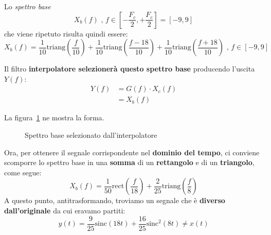 Lo \textit{spettro base} 
\[
    X_b(f) \text{ , } f\in \left[ -\frac{F_c}{2}, + \frac{F_c}{2} \right] = [-9,9]
\]
che viene ripetuto risulta quindi essere:
\[
    X_b(f) = \frac{1}{10} \text{triang} \left( \frac{f}{10} \right) +
             \frac{1}{10} \text{triang} \left( \frac{f-18}{10} \right) +
             \frac{1}{10} \text{triang} \left( \frac{f+18}{10} \right)
             \text{ , } f\in [-9,9]
\]

Il filtro \textbf{interpolatore selezionerà questo spettro base}
producendo l'uscita $Y(f)$:
\[
    \begin{aligned}
        Y(f) &= G(f)\cdot X_c(f) \\
             &= X_b(f)
    \end{aligned}
\]

La figura~\ref{fig:05_09_EsempioPratico1_SpettroBase} ne mostra la forma.

\begin{figure}[!ht]
    \centering
    \caption{Spettro base selezionato dall'interpolatore}
    \label{fig:05_09_EsempioPratico1_SpettroBase}
\end{figure}

Ora, per ottenere il segnale corrispondente nel \textbf{dominio del tempo}, 
ci conviene scomporre lo spettro base in una \textbf{somma} di un 
\textbf{rettangolo} e di un \textbf{triangolo}, come segue:
\[
    X_b(f) = \frac{1}{50} \text{rect} \left( \frac{f}{18} \right) +
             \frac{2}{25} \text{triang} \left( \frac{f}{8} \right)
\]
A questo punto, antitrasformando, troviamo un segnale che è \textbf{diverso dall'originale} 
da cui eravamo partiti:
\[
    y(t) = \frac{9}{25} \text{sinc}(18t) + \frac{16}{25} \text{sinc}^2(8t) \ne x(t)
\]

